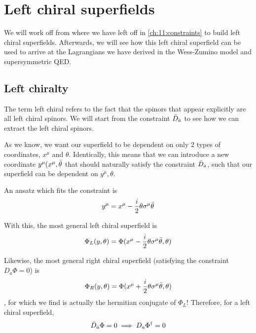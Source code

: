 \chapter{Left chiral superfields}
\label{ch:12}

We will work off from where we have left off in \ref{ch:11:constraints} to build left chiral superfields. Afterwards, we will see how this left chiral superfield can be used to arrive at the Lagrangians we have derived in the Wess-Zumino model and supersymmetric QED.

\section{Left chiralty}
The term left chiral refers to the fact that the spinors that appear explicitly are all left chiral spinors. We will start from the constraint $\Bar{D}_{\dot{a}}$ to see how we can extract the left chiral spinors.

As we know, we want our superfield to be dependent on only 2 types of coordinates, $x^\mu$ and $\theta$. Identically, this means that we can introduce a new coordinate $y^\mu(x^\mu, \Bar{ \theta}$ that should naturally satisfy the constraint $\Bar{D}_{\dot{a}}$, such that our superfield can be dependent on $y^\mu, \theta$.

An ansatz which fits the constraint is
\begin{equation}
    y^\mu = x^\mu -\frac{i}{2} \theta \sigma^\mu \Bar{\theta}
    \label{eqn:12:y ansatz}
\end{equation}

With this, the most general left chiral superfield is
\begin{equation}
    \Phi_L (y, \theta) = \Phi(x^\mu - \frac{i}{2} \theta \sigma^\mu \Bar{\theta}, \theta)
    \label{eqn:12:general left chiral superfield}
\end{equation}

Likewise, the most general right chiral superfield (satisfying the constraint $D_a \Phi = 0$) is
\begin{equation}
    \Phi_R (y, \theta) = \Phi(x^\mu + \frac{i}{2} \theta \sigma^\mu \Bar{\theta}, \theta)
    \label{eqn:12:general right chiral supefield}
\end{equation}
, for which we find is actually the hermitian conjugate of $\Phi_L$! Therefore, for a left chiral superfield,
\begin{equation}
    \Bar{D}_{\dot{a}} \Phi = 0 \implies D_a \Phi^\dagger = 0
\end{equation}


